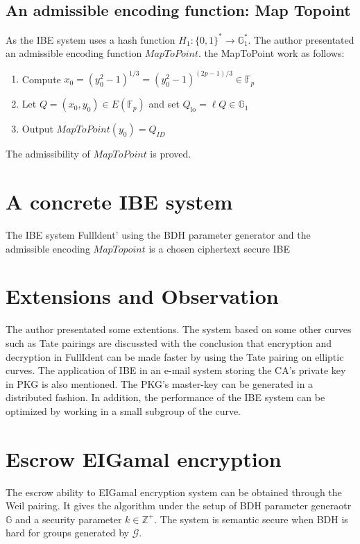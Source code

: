 \documentclass[11pt,en]{elegantpaper}
\begin{document}
\subsection{An admissible encoding function: Map Topoint}
As the IBE system uses a hash function $H_1:\{0,1\}^*\rightarrow\mathbb{G}_1^*$. The author presentated an admissible encoding function $MapToPoint$.
the MapToPoint work as follows:
\begin{enumerate}
	\item Compute $x_{0}=\left(y_{0}^{2}-1\right)^{1 / 3}=\left(y_{0}^{2}-1\right)^{(2 p-1) / 3} \in \mathbb{F}_{p}$
	\item Let $Q=\left(x_{0}, y_{0}\right) \in E\left(\mathbb{F}_{p}\right)$ and set $Q_{\mathrm{lo}}=\ell Q \in \mathbb{G}_{1}$
	\item Output $MapToPoint(y_0)=Q_{ID}$ 
\end{enumerate}
The admissibility of $MapToPoint$ is proved.

\section{A concrete IBE system}
The IBE system Fullldent' using the BDH parameter generator and the admissible encoding $MapTopoint$ is a chosen ciphertext secure IBE

\section{Extensions and Observation}
The author presentated some extentions. The system based on some other curves such as Tate pairings are discussted with the conclusion that encryption and decryption in FullIdent can be made faster by using the Tate pairing on elliptic curves. The application of IBE in an e-mail system storing the CA's private key in PKG is also mentioned. The PKG's master-key can be generated in a distributed fashion. In addition, the performance of the IBE system can be optimized by working in a small subgroup of the curve. 

\section {Escrow EIGamal encryption}
The escrow ability to EIGamal encryption system can be obtained through the Weil pairing. It gives the algorithm under the setup of BDH parameter generaotr $\mathbb{G}$ and a security parameter $k \in \mathbb{Z}^+$. The system is semantic secure when BDH is hard for groups generated by $\mathcal{G}$.
%
\end{document}
